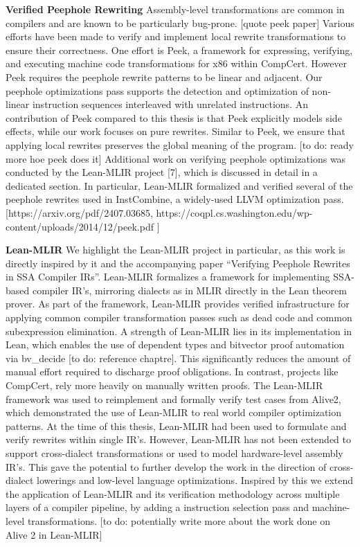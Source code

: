 \textbf{Verified Peephole Rewriting}
Assembly-level transformations are common in compilers and are known to be particularly bug-prone. [quote peek paper] Various efforts have been made to verify and implement local rewrite transformations to ensure their correctness. One effort is Peek, a framework for expressing, verifying, and executing machine code transformations for x86 within CompCert. However Peek requires the peephole rewrite patterns to be linear and adjacent. Our peephole optimizations pass supports the detection and optimization of non-linear instruction sequences interleaved with unrelated instructions. An contribution of Peek compared to this thesis is that Peek explicitly models side effects, while our work focuses on pure rewrites. Similar to Peek, we ensure that applying local rewrites preserves the global meaning of the program.
[to do: ready more hoe peek does it]
Additional work on verifying peephole optimizations was conducted by the Lean-MLIR project [7], which is discussed in detail in a dedicated section. In particular, Lean-MLIR formalized and verified several of the peephole rewrites used in InstCombine, a widely-used LLVM optimization pass.
[https://arxiv.org/pdf/2407.03685,
https://coqpl.cs.washington.edu/wp-content/uploads/2014/12/peek.pdf
]

\textbf{Lean-MLIR}
We highlight the Lean-MLIR project in particular, as this work is directly inspired by it and the accompanying paper “Verifying Peephole Rewrites in SSA Compiler IRs”. Lean-MLIR formalizes a framework for implementing SSA-based compiler IR's, mirroring dialects as in   MLIR directly in the Lean theorem prover. As part of the framework, Lean-MLIR provides verified infrastructure for applying common compiler transformation passes such as dead code  and common subexpression elimination. A strength of Lean-MLIR lies in its implementation in  Lean, which enables the use of dependent types and bitvector proof automation via bv\_decide [to do: reference chaptre]. This significantly reduces the amount of manual effort required to discharge proof obligations. In contrast, projects like CompCert, rely more heavily on manually written proofs. The Lean-MLIR framework was used to reimplement and formally verify test cases from Alive2, which demonstrated the use of Lean-MLIR to real world compiler optimization patterns. At the time of this thesis, Lean-MLIR had been used to formulate and verify rewrites within single IR's. However, Lean-MLIR has not been extended to support cross-dialect transformations or used to model hardware-level assembly IR's. This gave the potential to further develop the work in the direction of cross-dialect lowerings and low-level language optimizations. Inspired by this we extend the application of Lean-MLIR and its verification methodology across multiple layers of a compiler pipeline, by adding a instruction selection pass and machine-level transformations.
[to do: potentially write more about the work done on Alive 2 in Lean-MLIR]

